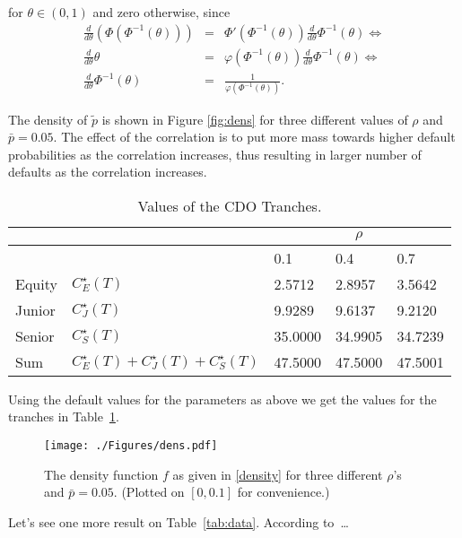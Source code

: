 for $\theta \in (0,1)$ and zero otherwise, since
\begin{eqnarray*}
\frac{d}{d \theta} \left(\Phi (\Phi^{-1}(\theta)) \right) &=&
\Phi'(\Phi^{-1}(\theta)) \frac{d}{d \theta} \Phi^{-1}(\theta)
\Leftrightarrow \\
\frac{d}{d \theta} \theta &=& \varphi(\Phi^{-1}(\theta))
\frac{d}{d \theta} \Phi^{-1}(\theta) \Leftrightarrow \\
\frac{d}{d \theta} \Phi^{-1}(\theta) &=&
\frac{1}{\varphi(\Phi^{-1}(\theta))}.
\end{eqnarray*}



The density of $\tilde{p}$ is shown in Figure \ref{fig:dens} for
three different values of $\rho$ and $\bar{p} = 0.05$. The effect of
the correlation is to put more mass towards higher default
probabilities as the correlation increases, thus resulting in larger
number of defaults as the correlation increases.

\begin{table}[htbp]
\caption{Values of the CDO Tranches.} \label{tab:cdo}
\begin{center}
\begin{tabular}{lllll}
\hline \hline
&            &             \multicolumn{ 3}{c}{$\rho$} \\
\hline
&            &       0.1 &        0.4 &        0.7 \\
\hline Equity &        $C_E^\star(T)$ &     2.5712 &     2.8957 &
3.5642 \\
Junior &        $C_J^\star(T)$ &     9.9289 &     9.6137 &
9.2120 \\
Senior &        $C_S^\star(T)$ &    35.0000 &    34.9905 &
34.7239 \\
\hline Sum & $C_E^\star(T) + C_J^\star(T) + C_S^\star(T)$ & 47.5000&
47.5000 &  47.5001 \\
\hline \hline
\end{tabular}
\end{center}
\end{table}
Using the default values for the parameters as above we get the
values for the tranches in Table~\ref{tab:cdo}.

\begin{figure}[thbp]
\begin{center}
\texttt{[image: ./Figures/dens.pdf]}
\caption{The density function $f$ as given in \eqref{density} for
  three different $\rho$'s and $\bar{p} = 0.05$. (Plotted on $[0,
  0.1]$ for convenience.)}
\label{fig:dens2}
\end{center}
\end{figure}


Let's see one more result on Table~\ref{tab:data}. According to~\cite{Fraz06}\ldots


